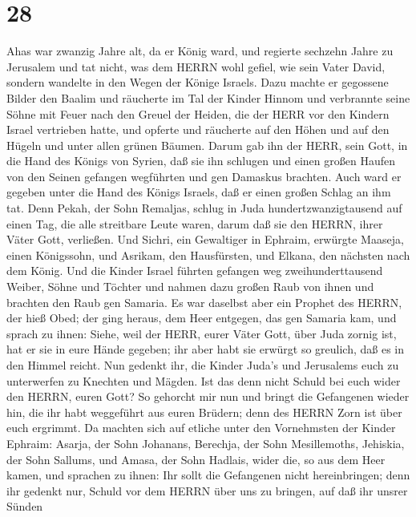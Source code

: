 \hypertarget{section-27}{%
\section{28}\label{section-27}}

 Ahas war zwanzig Jahre alt, da er König ward, und regierte
sechzehn Jahre zu Jerusalem und tat nicht, was dem HERRN wohl gefiel,
wie sein Vater David,  sondern wandelte in den Wegen der
Könige Israels. Dazu machte er gegossene Bilder den Baalim 
und räucherte im Tal der Kinder Hinnom und verbrannte seine Söhne mit
Feuer nach den Greuel der Heiden, die der HERR vor den Kindern Israel
vertrieben hatte,  und opferte und räucherte auf den Höhen
und auf den Hügeln und unter allen grünen Bäumen.  Darum gab
ihn der HERR, sein Gott, in die Hand des Königs von Syrien, daß sie ihn
schlugen und einen großen Haufen von den Seinen gefangen wegführten und
gen Damaskus brachten. Auch ward er gegeben unter die Hand des Königs
Israels, daß er einen großen Schlag an ihm tat.  Denn Pekah,
der Sohn Remaljas, schlug in Juda hundertzwanzigtausend auf einen Tag,
die alle streitbare Leute waren, darum daß sie den HERRN, ihrer Väter
Gott, verließen.  Und Sichri, ein Gewaltiger in Ephraim,
erwürgte Maaseja, einen Königssohn, und Asrikam, den Hausfürsten, und
Elkana, den nächsten nach dem König.  Und die Kinder Israel
führten gefangen weg zweihunderttausend Weiber, Söhne und Töchter und
nahmen dazu großen Raub von ihnen und brachten den Raub gen Samaria.
 Es war daselbst aber ein Prophet des HERRN, der hieß Obed;
der ging heraus, dem Heer entgegen, das gen Samaria kam, und sprach zu
ihnen: Siehe, weil der HERR, eurer Väter Gott, über Juda zornig ist, hat
er sie in eure Hände gegeben; ihr aber habt sie erwürgt so greulich, daß
es in den Himmel reicht.  Nun gedenkt ihr, die Kinder
Juda's und Jerusalems euch zu unterwerfen zu Knechten und Mägden. Ist
das denn nicht Schuld bei euch wider den HERRN, euren Gott?
 So gehorcht mir nun und bringt die Gefangenen wieder hin,
die ihr habt weggeführt aus euren Brüdern; denn des HERRN Zorn ist über
euch ergrimmt.  Da machten sich auf etliche unter den
Vornehmsten der Kinder Ephraim: Asarja, der Sohn Johanans, Berechja, der
Sohn Mesillemoths, Jehiskia, der Sohn Sallums, und Amasa, der Sohn
Hadlais, wider die, so aus dem Heer kamen,  und sprachen zu
ihnen: Ihr sollt die Gefangenen nicht hereinbringen; denn ihr gedenkt
nur, Schuld vor dem HERRN über uns zu bringen, auf daß ihr unsrer Sünden

